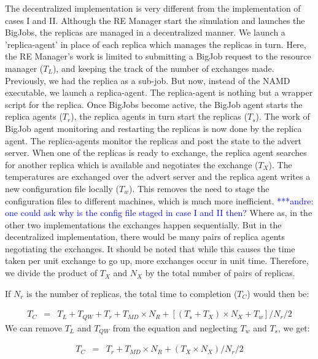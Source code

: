 \documentclass{rspublic}
\newcommand{\alnote}[1]{ {\textcolor{blue} { ***andre: #1 }}}
\newcommand{\alnote}[1]{}
\begin{document}
The decentralized implementation is very different from the implementation of cases I and II. Although the RE Manager start the simulation and launches the BigJobs, the replicas are managed in a decentralized manner. We launch
a 'replica-agent' in place of each replica which manages the replicas in turn.
Here, the RE Manager's work is limited to submitting a BigJob request to the resource manager ($T_{L}$), and keeping the track of the number of exchanges made. Previously, we had the replica as a sub-job. But now, instead of the NAMD executable, we launch a replica-agent.
The replica-agent is nothing but a wrapper script for the replica. 
Once BigJobs become active, the BigJob agent starts the replica agents ($T_{r}$), the replica agents in turn start the replicas ($T_{s}$). The work of BigJob agent monitoring and restarting the replicas is now done by the replica agent. The replica-agents 
monitor the replicas and post the state to the advert server. When one of the 
replicas is ready to exchange, the replica agent searches for another replica which is 
available and negotiates the exchange ($T_{X}$).  The temperatures are exchanged over the advert server and the replica agent writes a new configuration file locally ($T_{w}$). This removes the need to stage the 
configuration files to different machines, which is much more inefficient. \alnote {one could ask why is the 
config file staged in case I and II then?} Where as, in the other two implementations the exchanges happen sequentially. But in the decentralized implementation, there would be many pairs of replica agents negotiating the exchanges. It should be noted that while this causes the time taken per unit exchange to go up, more exchanges occur in unit time. Therefore, we divide the product of $T_{X}$ and $N_{X}$ by the total number of pairs of replicas.

If $N_{r}$ is the number of replicas, the total time to completion ($T_{C}$) would then be: 

  \begin{eqnarray}
T_{C} &=& T_{L}+T_{QW}+T_{r}+T_{MD} \times N_{R} + [(T_{s} + T_{X}) \times N_{X}+T_{w}]/N_{r}/2
\label{eq:equation}
\end{eqnarray}
We can remove $T_{L}$ and $T_{QW}$ from the equation and neglecting $T_{w}$ and $T_{s}$, we get:

  \begin{eqnarray}
T_{C} &=&T_{r}+T_{MD} \times N_{R} + (T_{X} \times N_{X})/N_{r}/2
\label{eq:equation}
\end{eqnarray}
\end{document}
